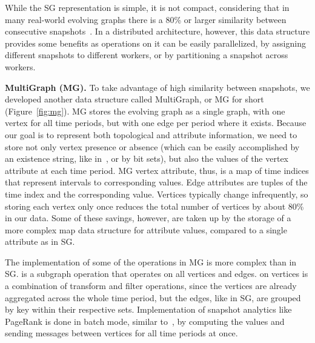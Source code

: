 While the SG representation is simple, it is not compact, considering
that in many real-world evolving graphs there is a 80\% or larger
similarity between consecutive
snapshots~\cite{DBLP:journals/tos/MiaoHLWYZPCC15}.  In a distributed
architecture, however, this data structure provides some benefits as
operations on it can be easily parallelized, by assigning different
snapshots to different workers, or by partitioning a snapshot across
workers.  

{\bf MultiGraph (MG).}  To take advantage of high similarity between
snapshots, we developed another data structure called MultiGraph, or
MG for short (Figure~\ref{fig:mg}).  MG stores the evolving graph as a
single graph, with one vertex for all time periods, but with one edge
per period where it exists.  Because our goal is to represent both
topological and attribute information, we need to store not only
vertex presence or absence (which can be easily accomplished by an
existence string, like in~\cite{Kan2009}, or by bit sets), but also
the values of the vertex attribute at each time period.  MG vertex
attribute, thus, is a map of time indices that represent intervals to
corresponding values.  Edge attributes are tuples of the time index
and the corresponding value.  Vertices typically change infrequently,
so storing each vertex only once reduces the total number of vertices
by about 80\% in our data.  Some of these savings, however, are taken
up by the storage of a more complex map data structure for attribute
values, compared to a single attribute as in SG.  

The implementation of some of the \ql operations in MG is more complex
than in SG.   is a subgraph operation that operates on
all vertices and edges.   on vertices is a combination
of transform and filter operations, since the vertices are already
aggregated across the whole time period, but the edges, like in SG,
are grouped by key within their respective sets.  Implementation of
snapshot analytics like PageRank is done in batch mode, similar
to~\cite{DBLP:journals/tos/MiaoHLWYZPCC15}, by computing the values
and sending messages between vertices for all time periods at once.

